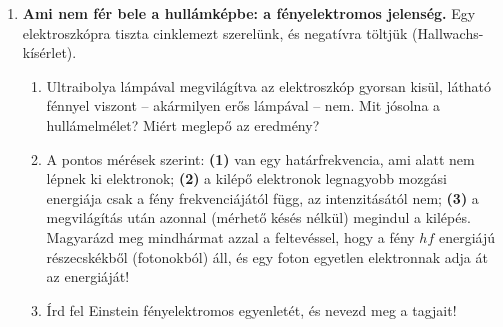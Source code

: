 \documentclass[12pt]{article}
\begin{document}
\newpage
\begin{minipage}[t]{0.74\linewidth}\vspace{0pt}
\begin{enumerate}[start=3]
\item \textbf{Ami nem fér bele a hullámképbe: a fényelektromos jelenség.} Egy
  elektroszkópra tiszta cinklemezt szerelünk, és negatívra töltjük (Hallwachs-kísérlet).
  \begin{enumerate}
    \item Ultraibolya lámpával megvilágítva az elektroszkóp gyorsan kisül, látható fénnyel
      viszont -- akármilyen erős lámpával -- nem. Mit jósolna a hullámelmélet? Miért
      meglepő az eredmény?
    \item A pontos mérések szerint: \textbf{(1)} van egy határfrekvencia, ami alatt nem
      lépnek ki elektronok; \textbf{(2)} a kilépő elektronok legnagyobb mozgási energiája
      csak a fény frekvenciájától függ, az intenzitásától nem; \textbf{(3)} a
      megvilágítás után azonnal (mérhető késés nélkül) megindul a kilépés. Magyarázd meg
      mindhármat azzal a feltevéssel, hogy a fény $hf$ energiájú részecskékből (fotonokból)
      áll, és egy foton egyetlen elektronnak adja át az energiáját!
    \item Írd fel Einstein fényelektromos egyenletét, és nevezd meg a tagjait!
  \end{enumerate}
\end{enumerate}
\end{minipage}\hfill
\begin{minipage}[t]{0.24\linewidth}\vspace{0pt}\centering
{}
\end{minipage}
\end{document}
